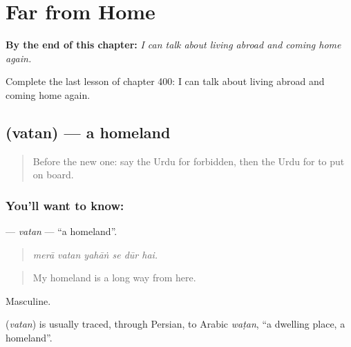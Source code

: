 
\chapter{Far from Home}
\label{ch:ur-far-from-home}

\begin{chapteropening}
\textbf{By the end of this chapter:} \emph{I can talk about living abroad and coming home again.}

Complete the last lesson of chapter 400: I can talk about living abroad and coming home again.
\end{chapteropening}

\section[\texorpdfstring{\ur{وطن} (vatan)}{وطن (vatan)}]{ (vatan) — a homeland}

\label{lesson:UR-C400-vatan}



\begin{quote}
Before the new one: say the Urdu for forbidden, then the Urdu for to put on board.
\end{quote}

\subsection*{You'll want to know: }
\textbf{} — \emph{vatan} — \textquotedblleft{}a homeland\textquotedblright{}.

\begin{quote}
     
\end{quote}

\begin{quote}
\emph{merā vatan yahāṅ se dūr hai.}
\end{quote}

\begin{quote}
My homeland is a long way from here.
\end{quote}

Masculine.

\begin{cousinweb}
\textbf{} (\emph{vatan}) is usually traced, through Persian, to Arabic \emph{waṭan}, \textquotedblleft{}a dwelling place, a homeland\textquotedblright{}.
\end{cousinweb}

